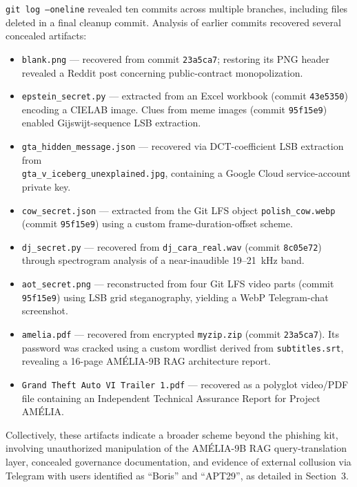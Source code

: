 \documentclass[11pt,a4paper,final,oneside]{article}
\begin{document}
\texttt{git log --oneline} revealed ten commits across multiple branches, including files deleted in a final cleanup commit. Analysis of earlier commits recovered several concealed artifacts:

\begin{itemize}
    \item \texttt{blank.png} --- recovered from commit \texttt{23a5ca7}; restoring its PNG header revealed a Reddit post concerning public-contract monopolization.

    \item \texttt{epstein\_secret.py} --- extracted from an Excel workbook (commit \texttt{43e5350}) encoding a CIELAB image. Clues from meme images (commit \texttt{95f15e9}) enabled Gijswijt-sequence LSB extraction.

    \item \texttt{gta\_hidden\_message.json} --- recovered via DCT-coefficient LSB extraction from\\ \texttt{gta\_v\_iceberg\_unexplained.jpg}, containing a Google Cloud service-account private key.

    \item \texttt{cow\_secret.json} --- extracted from the Git LFS object \texttt{polish\_cow.webp} \\ (commit \texttt{95f15e9}) using a custom frame-duration-offset scheme.

    \item \texttt{dj\_secret.py} --- recovered from \texttt{dj\_cara\_real.wav} (commit \texttt{8c05e72}) through spectrogram analysis of a near-inaudible 19--21~kHz band.

    \item \texttt{aot\_secret.png} --- reconstructed from four Git LFS video parts (commit \texttt{95f15e9}) using LSB grid steganography, yielding a WebP Telegram-chat screenshot.

    \item \texttt{amelia.pdf} --- recovered from encrypted \texttt{myzip.zip} (commit \texttt{23a5ca7}). Its password was cracked using a custom wordlist derived from \texttt{subtitles.srt}, revealing a 16-page AMÉLIA-9B RAG architecture report.

    \item \texttt{Grand Theft Auto VI Trailer 1.pdf} --- recovered as a polyglot video/PDF file containing an Independent Technical Assurance Report for Project AMÉLIA.
\end{itemize}

Collectively, these artifacts indicate a broader scheme beyond the phishing kit, involving unauthorized manipulation of the AMÉLIA-9B RAG query-translation layer, concealed governance documentation, and evidence of external collusion via Telegram with users identified as ``Boris'' and ``APT29'', as detailed in Section~3.
\end{document}
